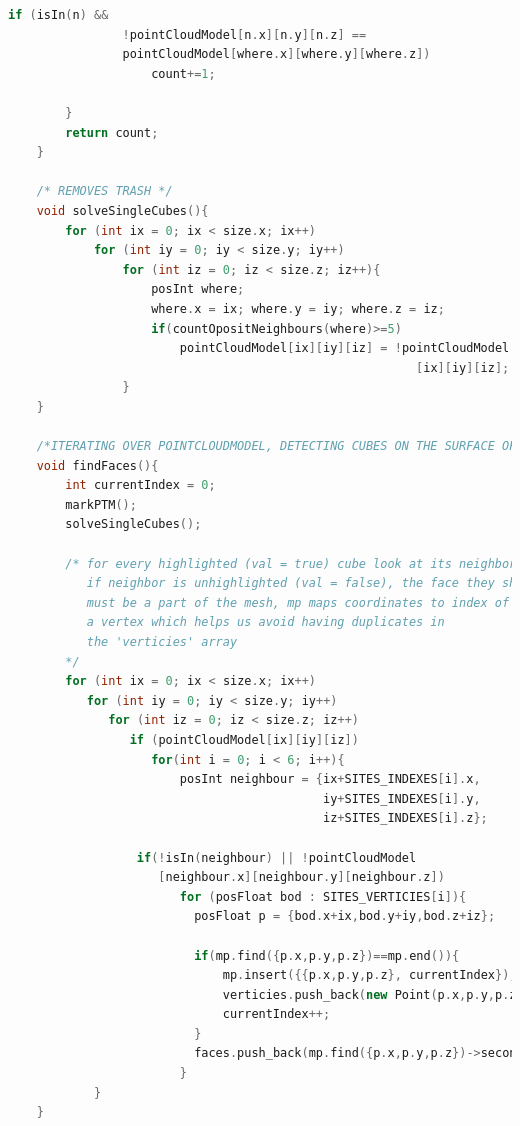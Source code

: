 \documentclass[12pt]{report}			%
\begin{document}
\begin{appendices}
\begin{lstlisting}[language = C++]
            if (isIn(n) &&
                !pointCloudModel[n.x][n.y][n.z] == 
                pointCloudModel[where.x][where.y][where.z])
                    count+=1;
                
        }
        return count;
    }

    /* REMOVES TRASH */
    void solveSingleCubes(){
        for (int ix = 0; ix < size.x; ix++)
            for (int iy = 0; iy < size.y; iy++)
                for (int iz = 0; iz < size.z; iz++){
                    posInt where;
                    where.x = ix; where.y = iy; where.z = iz;
                    if(countOpositNeighbours(where)>=5)
                        pointCloudModel[ix][iy][iz] = !pointCloudModel
                                                         [ix][iy][iz];
                }
    }

    /*ITERATING OVER POINTCLOUDMODEL, DETECTING CUBES ON THE SURFACE OF THE OBJECT, WRITING VERITICIES AND FACES INTO THEIR ARRAYS*/
    void findFaces(){
        int currentIndex = 0;   
        markPTM();
        solveSingleCubes();

        /* for every highlighted (val = true) cube look at its neighbors, 
           if neighbor is unhighlighted (val = false), the face they share
           must be a part of the mesh, mp maps coordinates to index of
           a vertex which helps us avoid having duplicates in 
           the 'verticies' array
        */ 
        for (int ix = 0; ix < size.x; ix++)
           for (int iy = 0; iy < size.y; iy++)
              for (int iz = 0; iz < size.z; iz++) 
                 if (pointCloudModel[ix][iy][iz])
                    for(int i = 0; i < 6; i++){
                        posInt neighbour = {ix+SITES_INDEXES[i].x,
                                            iy+SITES_INDEXES[i].y,
                                            iz+SITES_INDEXES[i].z};
            
                  if(!isIn(neighbour) || !pointCloudModel 
                     [neighbour.x][neighbour.y][neighbour.z])
                        for (posFloat bod : SITES_VERTICIES[i]){
                          posFloat p = {bod.x+ix,bod.y+iy,bod.z+iz}; 
                                
                          if(mp.find({p.x,p.y,p.z})==mp.end()){
                              mp.insert({{p.x,p.y,p.z}, currentIndex});
                              verticies.push_back(new Point(p.x,p.y,p.z));
                              currentIndex++;
                          }
                          faces.push_back(mp.find({p.x,p.y,p.z})->second);
                        }
            }
    }


\end{lstlisting}
\end{appendices}
\end{document}

